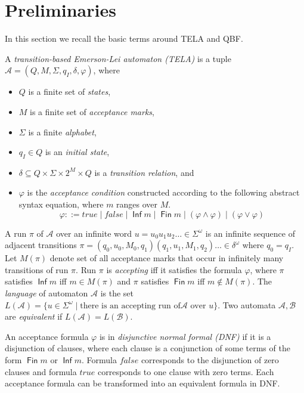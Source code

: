 \documentclass[a4paper,UKenglish,cleveref, autoref, thm-restate]{lipics-v2021}
\DeclareMathOperator{\Inf}{\mathsf{Inf}}
\DeclareMathOperator{\Fin}{\mathsf{Fin}}
\def\false{\mathit{false}}
\def\true{\mathit{true}}
\newcommand{\mA}{\mathcal{A}}
\newcommand{\mB}{\mathcal{B}}
\begin{document}

\section{Preliminaries}\label{sec:prelim}

In this section we recall the basic terms around TELA and QBF.

\begin{definition}[TELA]
  A \emph{transition-based Emerson-Lei automaton (TELA)} is a tuple
  $\mA =(Q,M,\Sigma,q_I,\delta,\varphi)$, where
  \begin{itemize}
  \item $Q$ is a finite set of \emph{states},
  \item $M$ is a finite set of \emph{acceptance marks},
  \item $\Sigma$ is a finite \emph{alphabet},
  \item $q_I\in Q$ is an \emph{initial state},
  \item $\delta \subseteq Q \times \Sigma \times 2^{M} \times Q$ is a
    \emph{transition relation}, and
  \item $\varphi$ is the \emph{acceptance condition} constructed
    according to the following abstract syntax equation, where $m$
    ranges over $M$.
    $$\varphi ::= \true \mid \false \mid \Inf m \mid \Fin m \mid \left( \varphi \land \varphi \right) \mid \left( \varphi \lor \varphi \right)$$
\end{itemize}
\end{definition}

A run $\pi$ of $\mA$ over an infinite word
$u = u_{0}u_{1}u_{2}\dots \in \Sigma^{\omega}$ is an infinite sequence
of adjacent transitions
$\pi=(q_0,u_0,M_0,q_1)(q_1,u_1,M_1,q_2)\dots\in\delta^{\omega}$ where
$q_0=q_I$. Let $M(\pi)$ denote set of all acceptance marks that occur
in infinitely many transitions of run $\pi$. Run $\pi$ is
\emph{accepting} iff it satisfies the formula $\varphi$, where $\pi$
satisfies $\Inf m$ iff $m\in M(\pi)$ and $\pi$ satisfies $\Fin m$
iff $m\not\in M(\pi)$. The \emph{language} of automaton $\mA$ is the
set
$L(\mA)=\{u\in \Sigma^{\omega}\mid\textrm{there is an accepting run of
}\mA\textrm{ over }u\}$. Two automata $\mA,\mB$ are \emph{equivalent}
if $L(\mA)=L(\mB)$.

An acceptance formula $\varphi$ is in \emph{disjunctive normal formal
  (DNF)} if it is a disjunction of clauses, where each clause is a
conjunction of some terms of the form $\Fin m$ or $\Inf m$. Formula
$\false$ corresponds to the disjunction of zero clauses and formula
$\true$ corresponds to one clause with zero terms. Each acceptance
formula can be transformed into an equivalent formula in DNF.
\end{document}
